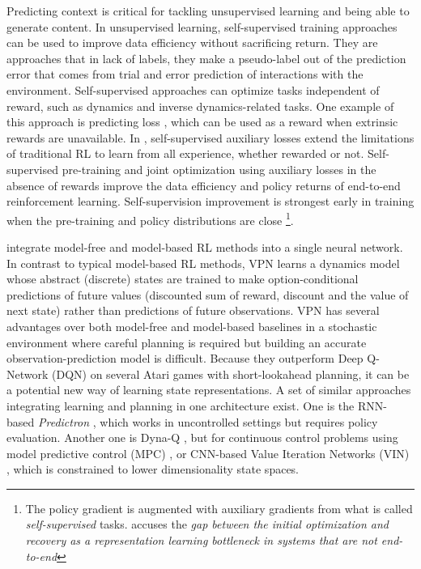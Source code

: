 \documentclass[a4paper]{article}
\begin{document}
Predicting context is critical for tackling unsupervised learning and being able to generate content. In unsupervised learning, self-supervised training approaches can be used to improve data efficiency without sacrificing return. They are approaches that in lack of labels, they make a pseudo-label out of the prediction error that comes from trial and error prediction of interactions with the environment. Self-supervised approaches can optimize tasks independent of reward, such as dynamics and inverse dynamics-related tasks. One example of this approach is predicting loss \cite{Shelhamer17}, which can be used as a reward when extrinsic rewards are unavailable. In \cite{Shelhamer17}, self-supervised auxiliary losses extend the limitations of traditional RL to learn from all experience, whether rewarded or not. Self-supervised pre-training and joint optimization using auxiliary losses in the absence of rewards improve the data efficiency and policy returns of end-to-end reinforcement learning.  Self-supervision improvement is strongest early in training when the pre-training and policy distributions are close \cite{Shelhamer17}\footnote{The policy gradient is augmented with auxiliary gradients from what is called \textit{self-supervised} tasks. \cite{Shelhamer17} accuses the \textit{gap between the initial optimization and recovery as a representation learning bottleneck in systems that are not end-to-end}}. %

\cite{Oh17} integrate model-free and model-based RL methods into a single neural network. In contrast to typical model-based RL methods, VPN learns a dynamics model whose abstract (discrete) states are trained to make option-conditional predictions of future values (discounted sum of reward, discount and the value of next state) rather than predictions of future observations. VPN has several advantages over both model-free and model-based baselines in a stochastic environment where careful planning is required but building an accurate observation-prediction model is difficult. Because they outperform Deep Q-Network (DQN) on several Atari games with short-lookahead planning, it can be a potential new way of learning state representations. 
A set of similar approaches integrating learning and planning in one architecture exist. One is the RNN-based \textit{Predictron} \cite{Silver16}, which works in uncontrolled settings  but requires policy evaluation. Another one is Dyna-Q \cite{Sutton90}, but for continuous control problems using model predictive control (MPC) \cite{Lenz15}, or CNN-based Value Iteration Networks (VIN) \cite{Tamar16}, which %
is constrained to lower dimensionality state spaces.
\end{document}
